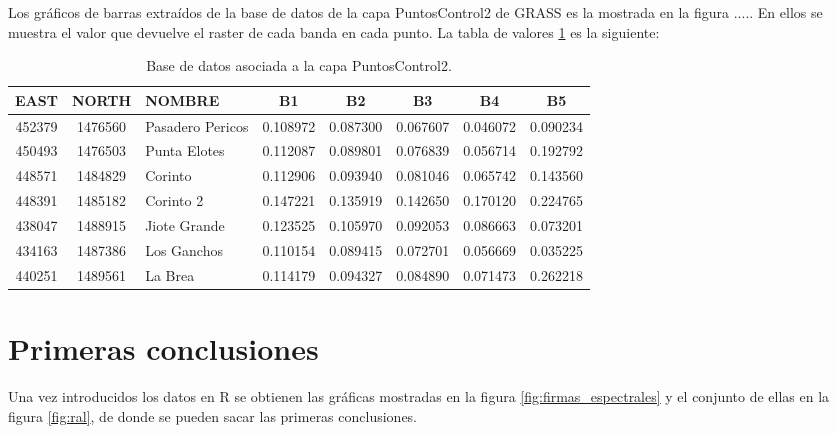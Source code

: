 Los gráficos de barras extraídos de la base de datos de la capa PuntosControl2 de GRASS es la mostrada en la figura ..... En ellos se muestra el valor que devuelve el raster de cada banda en cada punto. La tabla de valores \ref{tab:tabla_puntos} es la siguiente:

\begin{table}[ht]
	\centering
	\caption[Base de datos de puntos de control]{Base de datos asociada a la capa PuntosControl2.}
	\begin{tabular}{|c|c|l|c|c|c|c|c|}
	\hline
	EAST & NORTH & NOMBRE & B1 & B2 & B3 & B4 & B5\\
	\hline
	452379 & 1476560 & Pasadero Pericos & 0.108972 & 0.087300 & 0.067607 & 0.046072 & 0.090234\\
	\hline
	450493 & 1476503 & Punta Elotes & 0.112087 & 0.089801 & 0.076839 & 0.056714 & 0.192792\\
	\hline
	448571 & 1484829 & Corinto & 0.112906 & 0.093940 & 0.081046 & 0.065742 & 0.143560\\
	\hline
	448391 & 1485182 & Corinto 2 & 0.147221 & 0.135919 & 0.142650 & 0.170120 & 0.224765\\
	\hline
	438047 & 1488915 & Jiote Grande & 0.123525 & 0.105970 & 0.092053 & 0.086663 & 0.073201\\
	\hline
	434163 & 1487386 & Los Ganchos & 0.110154 & 0.089415 & 0.072701 & 0.056669 & 0.035225\\
	\hline
	440251 & 1489561 & La Brea & 0.114179 & 0.094327 & 0.084890 & 0.071473 & 0.262218\\
	\hline
	\end{tabular}
	\label{tab:tabla_puntos}
\end{table}

\section{Primeras conclusiones}
Una vez introducidos los datos en R se obtienen las gráficas mostradas en la figura \ref{fig:firmas_espectrales} y el conjunto de ellas en la figura \ref{fig:ral}, de donde se pueden sacar las primeras conclusiones.\Sep

